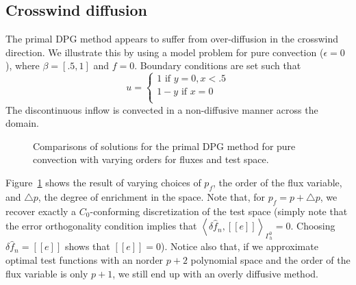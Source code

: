 \documentclass[final,leqno]{siamltex}
\newcommand{\LRs}[1]{\left[ #1 \right]}
\newcommand{\LRa}[1]{\left\langle #1 \right\rangle}
\newcommand{\jump}[1] {\ensuremath{\LRs{\!\left[#1\right]\!}}}
\newcommand{\fnh}{\widehat{f}_n}
\newcommand{\Gh}{\Gamma_h}
\begin{document}
\subsection{Crosswind diffusion}

The primal DPG method appears to suffer from over-diffusion in the crosswind direction.  We illustrate this by using a model problem for pure convection ($\epsilon = 0$), where $\beta = [.5,1]$ and $f=0$. Boundary conditions are set such that
\[
u = \begin{cases}
1 \text{ if } y = 0, x< .5\\
1-y \text{ if } x = 0\\
\end{cases}
\]
The discontinuous inflow is convected in a non-diffusive manner across the domain.  
\begin{figure}[!h]
\centering
{}
\caption{Comparisons of solutions for the primal DPG method for pure convection with varying orders for fluxes and test space.}
\label{fig:diffuse}
\end{figure}
Figure~\ref{fig:diffuse} shows the result of varying choices of $p_f$, the order of the flux variable, and $\triangle p$, the degree of enrichment in the space.  Note that, for $p_f = p+\triangle p$, we recover exactly a $C_0$-conforming discretization of the test space (simply note that the error orthogonality condition implies that $\LRa{\delta \fnh,\jump{e}}_{\Gh^0} = 0$.  Choosing $\delta \fnh = \jump{e}$ shows that $\jump{e} = 0$).  Notice also that, if we approximate optimal test functions with an norder $p+2$ polynomial space and the order of the flux variable is only $p+1$, we still end up with an overly diffusive method.  
\end{document}
